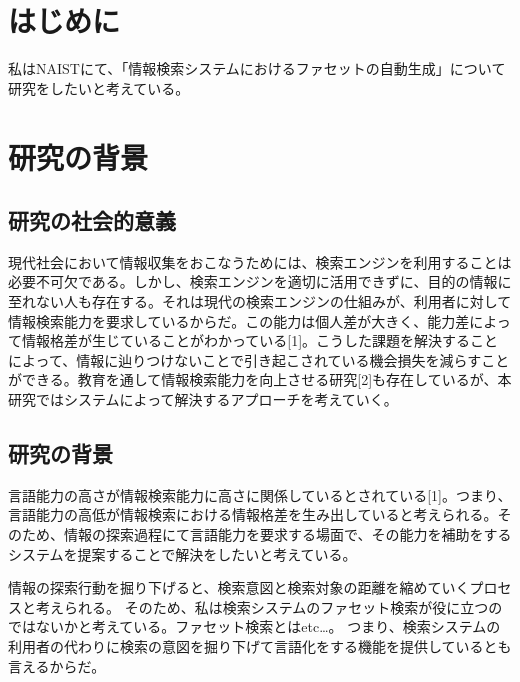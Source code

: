 \documentclass[a4j,10pt, twocolumn]{jarticle}
\begin{document}
\section{はじめに}
私はNAISTにて、「情報検索システムにおけるファセットの自動生成」について研究をしたいと考えている。
\section{研究の背景}
\subsection{研究の社会的意義}
現代社会において情報収集をおこなうためには、検索エンジンを利用することは必要不可欠である。しかし、検索エンジンを適切に活用できずに、目的の情報に至れない人も存在する。それは現代の検索エンジンの仕組みが、利用者に対して情報検索能力を要求しているからだ。この能力は個人差が大きく、能力差によって情報格差が生じていることがわかっている[1]。こうした課題を解決することによって、情報に辿りつけないことで引き起こされている機会損失を減らすことができる。教育を通して情報検索能力を向上させる研究[2]も存在しているが、本研究ではシステムによって解決するアプローチを考えていく。
\subsection{研究の背景}
言語能力の高さが情報検索能力に高さに関係しているとされている[1]。つまり、言語能力の高低が情報検索における情報格差を生み出していると考えられる。そのため、情報の探索過程にて言語能力を要求する場面で、その能力を補助をするシステムを提案することで解決をしたいと考えている。

情報の探索行動を掘り下げると、検索意図と検索対象の距離を縮めていくプロセスと考えられる。
そのため、私は検索システムのファセット検索が役に立つのではないかと考えている。ファセット検索とはetc\dots。
つまり、検索システムの利用者の代わりに検索の意図を掘り下げて言語化をする機能を提供しているとも言えるからだ。
\end{document}
